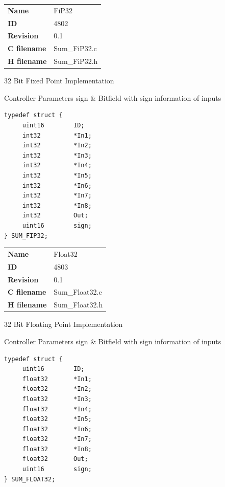 \ifdefined \AddTestReports
{}
\fi
{}
\nopagebreak[0]
\begin{tabular}{l l}
\textbf{Name} & FiP32 \tabularnewline
\textbf{ID} & 4802 \tabularnewline
\textbf{Revision} & 0.1 \tabularnewline
\textbf{C filename} & Sum\_FiP32.c \tabularnewline
\textbf{H filename} & Sum\_FiP32.h \tabularnewline
\end{tabular}
\vspace{1ex}

32 Bit Fixed Point Implementation

\begin{XtoCtabular}{Controller Parameters}
sign & Bitfield with sign information of inputs\tabularnewline
\hline
\end{XtoCtabular}

\begin{lstlisting}
typedef struct {
     uint16        ID;
     int32         *In1;
     int32         *In2;
     int32         *In3;
     int32         *In4;
     int32         *In5;
     int32         *In6;
     int32         *In7;
     int32         *In8;
     int32         Out;
     uint16        sign;
} SUM_FIP32;
\end{lstlisting}

\ifdefined \AddTestReports
{}
\fi
{}
\nopagebreak[0]
\begin{tabular}{l l}
\textbf{Name} & Float32 \tabularnewline
\textbf{ID} & 4803 \tabularnewline
\textbf{Revision} & 0.1 \tabularnewline
\textbf{C filename} & Sum\_Float32.c \tabularnewline
\textbf{H filename} & Sum\_Float32.h \tabularnewline
\end{tabular}
\vspace{1ex}

32 Bit Floating Point Implementation

\begin{XtoCtabular}{Controller Parameters}
sign & Bitfield with sign information of inputs\tabularnewline
\hline
\end{XtoCtabular}

\begin{lstlisting}
typedef struct {
     uint16        ID;
     float32       *In1;
     float32       *In2;
     float32       *In3;
     float32       *In4;
     float32       *In5;
     float32       *In6;
     float32       *In7;
     float32       *In8;
     float32       Out;
     uint16        sign;
} SUM_FLOAT32;
\end{lstlisting}

